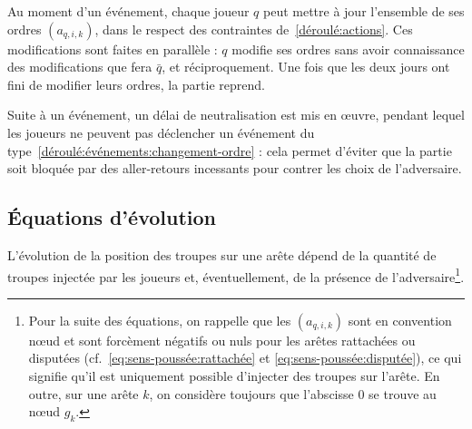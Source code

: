 \documentclass[a4paper,11pt,headings=normal]{scrartcl}
\theoremstyle{mythm}
\begin{document}
Au moment d'un événement, chaque joueur $q$ peut mettre à jour
l'ensemble de ses ordres $(a_{q,i,k})$, dans le respect des
contraintes de~\ref{déroulé:actions}. Ces modifications sont faites en
parallèle : $q$ modifie ses ordres sans avoir connaissance des
modifications que fera $\bar q$, et réciproquement. Une fois que les
deux jours ont fini de modifier leurs ordres, la partie reprend.

Suite à un événement, un délai de neutralisation est mis en œuvre,
pendant lequel les joueurs ne peuvent pas déclencher un événement du
type~\ref{déroulé:événements:changement-ordre} : cela permet d'éviter
que la partie soit bloquée par des aller-retours incessants pour
contrer les choix de l'adversaire.

\subsection{{\'E}quations d'évolution}

L'évolution de la position des troupes sur une arête dépend de la
quantité de troupes injectée par les joueurs et, éventuellement, de la
présence de l'adversaire\footnote{Pour la suite des équations, on
rappelle que les $(a_{q,i,k})$ sont en convention \og nœud \fg{} et
sont forcèment négatifs ou nuls pour les arêtes rattachées ou
disputées (cf.~\eqref{eq:sens-poussée:rattachée} et
\eqref{eq:sens-poussée:disputée}), ce qui signifie qu'il est
uniquement possible d'injecter des troupes sur l'arête. En outre, sur
une arête $k$, on considère toujours que l'abscisse 0 se trouve au
nœud $g_k$.}.
\end{document}
